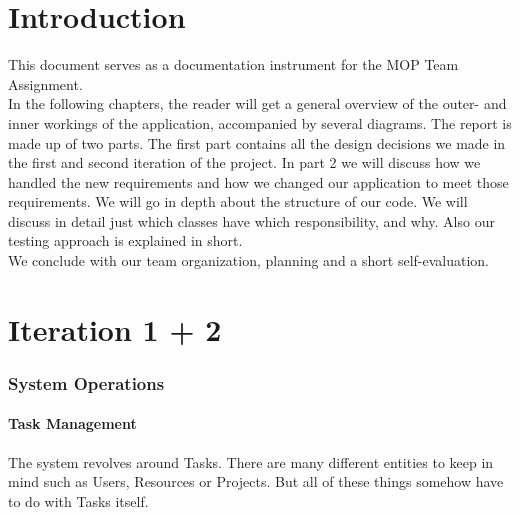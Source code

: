 



\maakvoorblad

\newpage
\thispagestyle{empty}
\mbox{}

\newpage
\maakvoorblad

\newpage

\tableofcontents

\newpage

\part{Introduction}
		This document serves as a documentation instrument for the MOP Team Assignment.\\
		In the following chapters, the reader will get a general overview of the outer- and inner workings of the application, accompanied by several diagrams. The report is made up of two parts. The first part contains all the design decisions we made in the first and second iteration of the project. In part 2 we will discuss how we handled the new requirements and how we changed our application to meet those requirements.
		We will go in depth about the structure of our code. We will discuss in detail just which classes have which responsibility, and why. Also our testing approach is explained in short.\\
		We conclude with our team organization, planning and a short self-evaluation.

\part{Iteration 1 + 2}

	\section{System Operations}
		\subsection{Task Management}
			The system revolves around Tasks. There are many different entities to keep in mind such as Users, Resources or Projects.
			But all of these things somehow have to do with Tasks itself.
